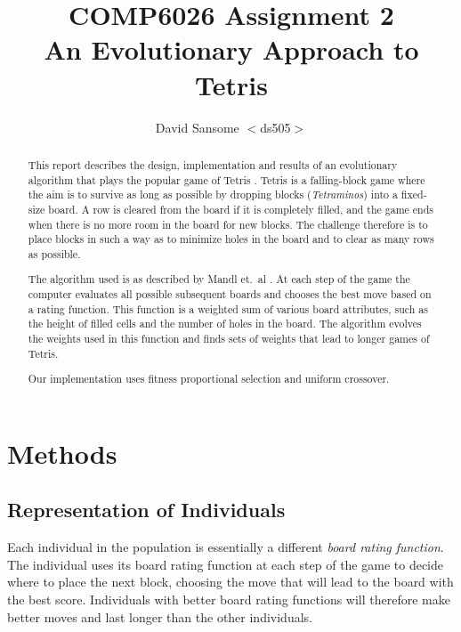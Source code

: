 \documentclass[a4paper,12pt]{article}
\title{COMP6026 Assignment 2 \\
An Evolutionary Approach to Tetris}
\author{David Sansome $<$ds505$>$}
\begin{document}


\maketitle

\begin{abstract}

This report describes the design, implementation and results of an evolutionary
algorithm that plays the popular game of Tetris \cite{AboutTetris}.
Tetris is a falling-block game where the aim is to survive as long as possible
by dropping blocks (\emph{Tetraminos}) into a fixed-size board.
A row is cleared from the board if it is completely filled, and the game ends
when there is no more room in the board for new blocks.
The challenge therefore is to place blocks in such a way as to minimize holes
in the board and to clear as many rows as possible.

The algorithm used is as described by Mandl et.\ al \cite{Mandl2005}.
At each step of the game the computer evaluates all possible subsequent boards
and chooses the best move based on a rating function.
This function is a weighted sum of various board attributes, such as the height
of filled cells and the number of holes in the board.
The algorithm evolves the weights used in this function and finds sets of
weights that lead to longer games of Tetris.

Our implementation uses fitness proportional selection and uniform crossover.

\end{abstract}

\clearpage
\tableofcontents

\section{Methods}

\subsection{Representation of Individuals}

Each individual in the population is essentially a different \emph{board
rating function}.
The individual uses its board rating function at each step of the game to
decide where to place the next block, choosing the move that will lead to the
board with the best score.
Individuals with better board rating functions will therefore make better moves
and last longer than the other individuals.
\end{document}
